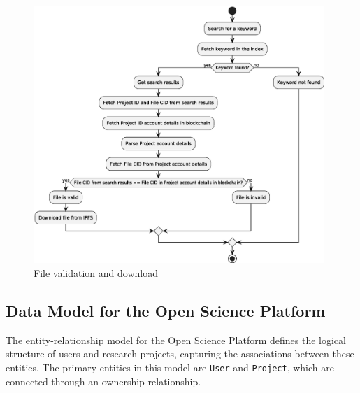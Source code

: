 \documentclass{article}
\begin{document}
\begin{figure}[htbp]
      \centering
      \includegraphics[width=0.98\textwidth, keepaspectratio]{keyword_and_file_validation.eps}
      \caption{File validation and download}
      \label{fig:c4_file_validation}
\end{figure}



\subsection{Data Model for the Open Science Platform}

The entity-relationship model for the Open Science Platform defines the logical structure of users and research projects, capturing the associations between these entities. The primary entities in this model are \texttt{User} and \texttt{Project}, which are connected through an ownership relationship.
\end{document}
